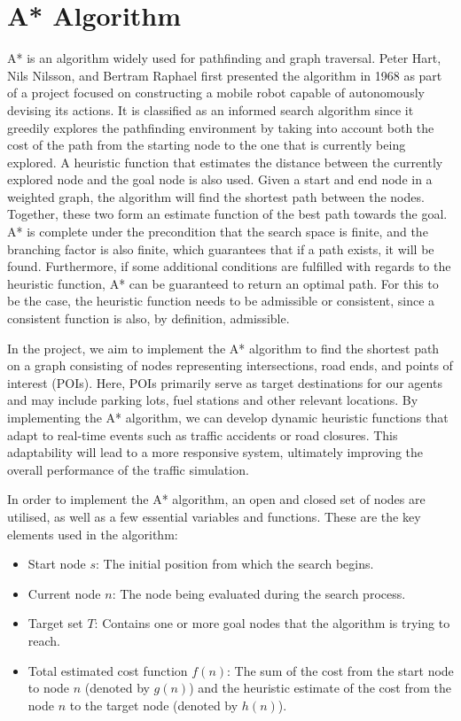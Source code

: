 \section{A* Algorithm}
    A* is an algorithm widely used for pathfinding and graph traversal. Peter Hart, Nils Nilsson, and Bertram Raphael first presented the algorithm in 1968 as part of a project focused on constructing a mobile robot capable of autonomously devising its actions\cite{hart1968formal}. It is classified as an informed search algorithm since it greedily explores the pathfinding environment by taking into account both the cost of the path from the starting node to the one that is currently being explored. A heuristic function that estimates the distance between the currently explored node and the goal node is also used\cite{russell2016artificial}. Given a start and end node in a weighted graph, the algorithm will find the shortest path between the nodes. Together, these two form an estimate function of the best path towards the goal. A* is complete under the precondition that the search space is finite, and the branching factor is also finite, which guarantees that if a path exists, it will be found. Furthermore, if some additional conditions are fulfilled with regards to the heuristic function, A* can be guaranteed to return an optimal path. For this to be the case, the heuristic function needs to be admissible or consistent, since a consistent function is also, by definition, admissible\cite{dechter1985generalized}.

    In the project, we aim to implement the A* algorithm to find the shortest path on a graph consisting of nodes representing intersections, road ends, and points of interest (POIs). Here, POIs primarily serve as target destinations for our agents and may include parking lots, fuel stations and other relevant locations. By implementing the A* algorithm, we can develop dynamic heuristic functions that adapt to real-time events such as traffic accidents or road closures. This adaptability will lead to a more responsive system, ultimately improving the overall performance of the traffic simulation. 
    
    In order to implement the A* algorithm, an open and closed set of nodes are utilised, as well as a few essential variables and functions. These are the key elements used in the algorithm:

    \begin{itemize}
        \item Start node $s$: The initial position from which the search begins.
        \item Current node $n$: The node being evaluated during the search process.
        \item Target set $T$: Contains one or more goal nodes that the algorithm is trying to reach.
        \item Total estimated cost function $f(n)$: The sum of the cost from the start node to node $n$ (denoted by $g(n)$) and the heuristic estimate of the cost from the node $n$ to the target node (denoted by $h(n)$).
    \end{itemize}

